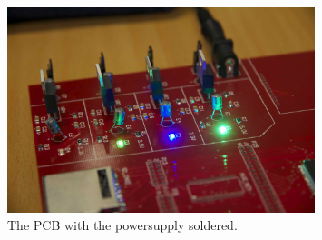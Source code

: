 \begin{figure}[h]
  \centering
  \includegraphics[width=0.8\textwidth]{fig/pcb/pcb_powersoldered.jpeg}
  \caption[The PCB Power Supply]{The PCB with the powersupply soldered.}
  \label{fig:pcb-powersoldered}
\end{figure}
